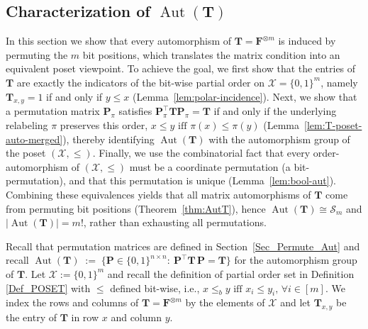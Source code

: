 \documentclass[onecolumn]{IEEEtran} %
\newcommand{\1}{\mathbbm{1}}
\DeclareMathOperator{\Aut}{Aut}
\theoremstyle{boldremark}
\newcommand{\bT}{\mathbf{T}}
\begin{document}











\subsection{Characterization of $\Aut(\mathbf T)$}\label{sec_Aut_characterization}
In this section we show that every automorphism of \(\mathbf T=\mathbf F^{\otimes m}\) is induced by permuting the \(m\) bit positions, which translates the matrix condition into an equivalent poset viewpoint. To achieve the goal, we first show that the entries of \(\mathbf T\) are exactly the indicators of the bit-wise partial order on \(\mathcal X=\{0,1\}^m\), namely \(\mathbf T_{x,y}=1\) if and only if \(y\le x\) (Lemma~\ref{lem:polar-incidence}).
Next, we show that a permutation matrix \(\mathbf P_\pi\) satisfies \(\mathbf P_\pi^{\!\top}\mathbf T\mathbf P_\pi=\mathbf T\) if and only if the underlying relabeling \(\pi\) preserves this order,
\(x\le y \mbox{ iff } \pi(x)\le \pi(y)\) (Lemma~\ref{lem:T-poset-auto-merged}),
thereby identifying \(\Aut(\mathbf T)\) with the automorphism group of the poset \((\mathcal X,\le)\).
Finally, we use the combinatorial fact that every order-automorphism of \((\mathcal X,\le)\) must be a coordinate permutation (a bit-permutation), and that this permutation is unique (Lemma~\ref{lem:bool-aut}).
Combining these equivalences yields that all matrix automorphisms of \(\mathbf T\) come from permuting bit positions (Theorem~\ref{thm:AutT}), hence \(\Aut(\mathbf T)\cong\mathcal S_m\) and \(|\Aut(\mathbf T)|=m!\), rather than exhausting all permutations.



Recall that permutation matrices are defined in
Section~\ref{Sec_Permute_Aut} and recall $  \Aut(\mathbf T)
  \;:=\;  \bigl\{\mathbf P\in\{0,1\}^{n\times n}:\ \mathbf P^{\!\top}\mathbf T\,\mathbf P=\mathbf T\bigr\}$ for the automorphism group of $\mathbf T$. Let $\mathcal{X}:=\{0,1\}^m$ and recall the definition of partial order set in Definition \ref{Def_POSET} with $\leq$ defined bit-wise, i.e., $x\leq_b y\mbox{ iff } x_i\leq y_i,\,\forall i\in[m]$. We index the rows and columns of $\mathbf T=\mathbf F^{\otimes m}$ by the
elements of $\mathcal{X}$ and let $\mathbf T_{x,y}$ be the entry of $\bT$ in row $x$ and column $y$.
\end{document}
